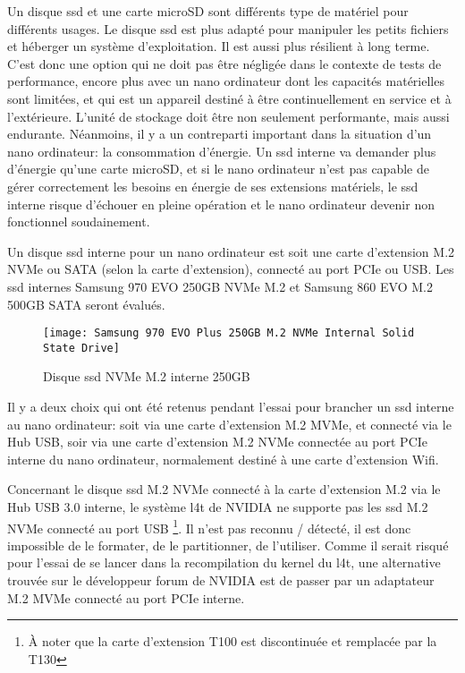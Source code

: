 \par Un disque \acrshort{ssd} et une carte microSD sont différents type de matériel pour différents usages. Le disque \acrshort{ssd} est plus adapté pour manipuler les petits fichiers et héberger un système d'exploitation. Il est aussi plus résilient à long terme. C'est donc une option qui ne doit pas être négligée dans le contexte de tests de performance, encore plus avec un nano ordinateur dont les capacités matérielles sont limitées, et qui est un appareil destiné à être continuellement en service et à l'extérieure. L'unité de stockage doit être non seulement performante, mais aussi endurante. Néanmoins, il y a un contreparti important dans la situation d'un nano ordinateur: la consommation d'énergie. Un \acrshort{ssd} interne va demander plus d'énergie qu'une carte microSD, et si le nano ordinateur n'est pas capable de gérer correctement les besoins en énergie de ses extensions matériels, le \acrshort{ssd} interne risque d'échouer en pleine opération et le nano ordinateur devenir non fonctionnel soudainement.
\par Un disque \acrshort{ssd} interne pour un nano ordinateur est soit une carte d'extension M.2 NVMe ou SATA (selon la carte d'extension), connecté au port PCIe ou USB. Les \acrshort{ssd} internes Samsung 970 EVO 250GB NVMe M.2 et Samsung 860 EVO M.2 500GB SATA seront évalués.
\begin{figure}[H]
    \centering
    \texttt{[image: Samsung 970 EVO Plus 250GB M.2 NVMe Internal Solid State Drive]}
    \caption{Disque \acrshort{ssd} NVMe M.2 interne 250GB}
    \label{fig:disquessd}
\end{figure}
\par Il y a deux choix qui ont été retenus pendant l'essai pour brancher un \acrshort{ssd} interne au nano ordinateur: soit via une carte d'extension M.2 MVMe, et connecté via le Hub USB, soir via une carte d'extension M.2 NVMe connectée au port PCIe interne du nano ordinateur, normalement destiné à une carte d'extension Wifi.
\par Concernant le disque \acrshort{ssd} M.2 NVMe connecté à la carte d'extension M.2 via le Hub USB 3.0 interne, le système \acrshort{l4t} de NVIDIA ne supporte pas les \acrshort{ssd} M.2 NVMe connecté au port USB \footnote{À noter que la carte d'extension T100 est discontinuée et remplacée par la T130}. Il n'est pas reconnu / détecté, il est donc impossible de le formater, de le partitionner, de l'utiliser. Comme il serait risqué pour l'essai de se lancer dans la recompilation du kernel du \acrshort{l4t}, une alternative trouvée sur le développeur forum de NVIDIA est de passer par un adaptateur M.2 MVMe connecté au port PCIe interne.
